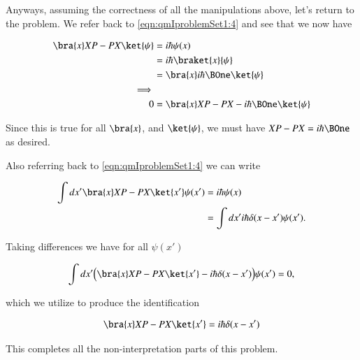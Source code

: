 Anyways, assuming the correctness of all the manipulations above, let's return to the problem.  We refer back to \ref{eqn:qmIproblemSet1:4} and see that we now have

\begin{align*}
\bra{x} XP - PX \ket{\psi}
&= i \hbar \psi(x) \\
&= i \hbar\braket{x}{\psi} \\
&= \bra{x} i \hbar \BOne \ket{\psi} \\
\implies \\
0 &= \bra{x} XP - PX - i\hbar \BOne \ket{\psi}
\end{align*}

Since this is true for all $\bra{x}$, and $\ket{\psi}$, we must have $XP - PX = i \hbar \BOne$ as desired.

Also referring back to \ref{eqn:qmIproblemSet1:4} we can write

\begin{align*}
\int dx' \bra{x} XP - PX \ket{x'} \psi(x')
&=
i\hbar \psi(x)  \\
&=
\int dx' i\hbar \delta(x-x') \psi(x').
\end{align*}

Taking differences we have for all $\psi(x')$

\begin{align*}
\int dx' \Bigl( \bra{x} XP - PX \ket{x'} -i \hbar \delta(x-x') \Bigl) \psi(x') = 0,
\end{align*}

which we utilize to produce the identification

\begin{align}\label{eqn:qmIproblemSet1:5}
\bra{x} XP - PX \ket{x'} = i \hbar \delta(x-x')
\end{align}

This completes all the non-interpretation parts of this problem.

